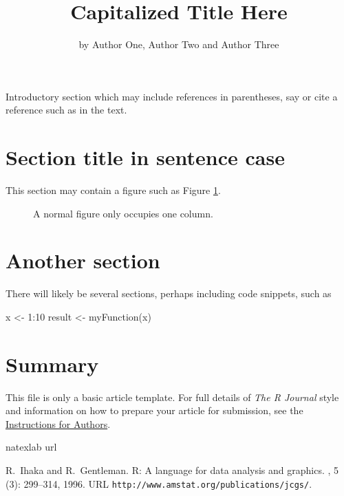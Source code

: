 \title{Capitalized Title Here}
\author{by Author One, Author Two and Author Three}

\maketitle


Introductory section which may include references in parentheses, say
\citep{R:Ihaka+Gentleman:1996} or cite a reference such as
\citet{R:Ihaka+Gentleman:1996} in the text.

\section{Section title in sentence case}

This section may contain a figure such as Figure \ref{figure:onecolfig}.

\begin{figure}
\vspace*{.1in}
\caption{\label{figure:onecolfig}
A normal figure only occupies one column.}
\end{figure}

\section{Another section}

There will likely be several sections, perhaps including code snippets, such
as
\begin{example}
  x <- 1:10
  result <- myFunction(x)
\end{example}

\section{Summary}

This file is only a basic article template. For full details of \emph{The R Journal}
style and information on how to prepare your article for submission, see the
\href{http://journal.r-project.org/latex/RJauthorguide.pdf}{Instructions for Authors}.

%

\begin{thebibliography}{1}
\expandafter\ifx\csname natexlab\endcsname\relax\def\natexlab#1{#1}\fi
\expandafter\ifx\csname url\endcsname\relax
  \def\url#1{{\tt #1}}\fi

R.~Ihaka and R.~Gentleman.
\newblock R: A language for data analysis and graphics.
, 5
  (3): 299--314, 1996.
\newblock URL \url{http://www.amstat.org/publications/jcgs/}.

\end{thebibliography}


